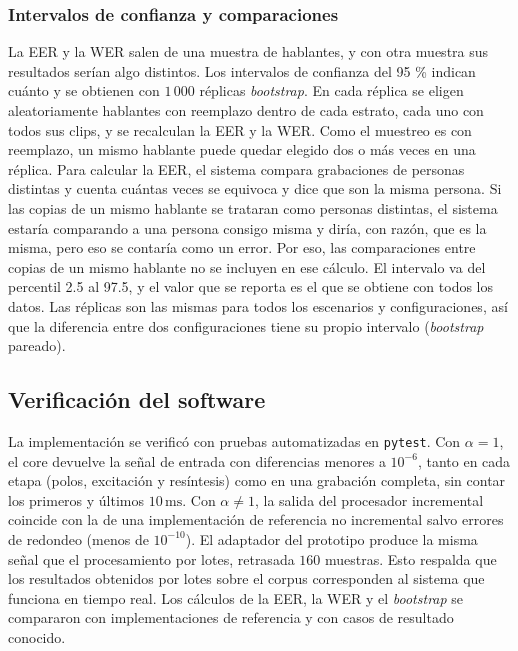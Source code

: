 \documentclass[10pt,twocolumn]{article}
\begin{document}
\subsubsection{Intervalos de confianza y comparaciones}\label{sec:4.5.4}

La EER y la WER salen de una muestra de hablantes, y con otra muestra sus resultados serían algo distintos. Los intervalos de confianza del 95 \% indican cuánto y se obtienen con $1\,000$ réplicas \textit{bootstrap}. En cada réplica se eligen aleatoriamente hablantes con reemplazo dentro de cada estrato, cada uno con todos sus clips, y se recalculan la EER y la WER. Como el muestreo es con reemplazo, un mismo hablante puede quedar elegido dos o más veces en una réplica. Para calcular la EER, el sistema compara grabaciones de personas distintas y cuenta cuántas veces se equivoca y dice que son la misma persona. Si las copias de un mismo hablante se trataran como personas distintas, el sistema estaría comparando a una persona consigo misma y diría, con razón, que es la misma, pero eso se contaría como un error. Por eso, las comparaciones entre copias de un mismo hablante no se incluyen en ese cálculo. El intervalo va del percentil 2.5 al 97.5, y el valor que se reporta es el que se obtiene con todos los datos. Las réplicas son las mismas para todos los escenarios y configuraciones, así que la diferencia entre dos configuraciones tiene su propio intervalo (\textit{bootstrap} pareado).

\subsection{Verificación del software}\label{sec:4.6}

La implementación se verificó con pruebas automatizadas en \texttt{pytest}. Con $\alpha=1$, el core devuelve la señal de entrada con diferencias menores a $10^{-6}$, tanto en cada etapa (polos, excitación y resíntesis) como en una grabación completa, sin contar los primeros y últimos $10\,\mathrm{ms}$. Con $\alpha\ne1$, la salida del procesador incremental coincide con la de una implementación de referencia no incremental salvo errores de redondeo (menos de $10^{-10}$). El adaptador del prototipo produce la misma señal que el procesamiento por lotes, retrasada $160$ muestras. Esto respalda que los resultados obtenidos por lotes sobre el corpus corresponden al sistema que funciona en tiempo real. Los cálculos de la EER, la WER y el \textit{bootstrap} se compararon con implementaciones de referencia y con casos de resultado conocido.
\end{document}

